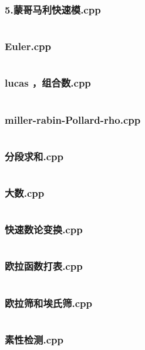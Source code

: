 \documentclass[a4paper,11pt]{article}
\begin{document}
\subsubsection{5.蒙哥马利快速模.cpp}
\inputminted[breaklines]{c++}{"D:/tmplz/templates/数学/数论/5.蒙哥马利快速模.cpp"}
\subsubsection{Euler.cpp}
\inputminted[breaklines]{c++}{"D:/tmplz/templates/数学/数论/Euler.cpp"}
\subsubsection{lucas ，组合数.cpp}
\inputminted[breaklines]{c++}{"D:/tmplz/templates/数学/数论/lucas ，组合数.cpp"}
\subsubsection{miller-rabin-Pollard-rho.cpp}
\inputminted[breaklines]{c++}{"D:/tmplz/templates/数学/数论/miller-rabin-Pollard-rho.cpp"}
\subsubsection{分段求和.cpp}
\inputminted[breaklines]{c++}{"D:/tmplz/templates/数学/数论/分段求和.cpp"}
\subsubsection{大数.cpp}
\inputminted[breaklines]{c++}{"D:/tmplz/templates/数学/数论/大数.cpp"}
\subsubsection{快速数论变换.cpp}
\inputminted[breaklines]{c++}{"D:/tmplz/templates/数学/数论/快速数论变换.cpp"}
\subsubsection{欧拉函数打表.cpp}
\inputminted[breaklines]{c++}{"D:/tmplz/templates/数学/数论/欧拉函数打表.cpp"}
\subsubsection{欧拉筛和埃氏筛.cpp}
\inputminted[breaklines]{c++}{"D:/tmplz/templates/数学/数论/欧拉筛和埃氏筛.cpp"}
\subsubsection{素性检测.cpp}
\inputminted[breaklines]{c++}{"D:/tmplz/templates/数学/数论/素性检测.cpp"}
\end{document}
